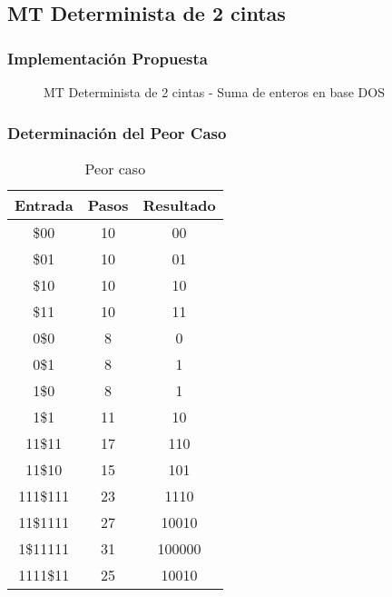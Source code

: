\documentclass{uc3mpracticas}
\begin{document}
  \subsection{MT Determinista de 2 cintas}

  \subsubsection{Implementación Propuesta}

  \begin{figure}[!h]
    \caption{MT Determinista de 2 cintas - Suma de enteros en base DOS}
  \end{figure}


  \subsubsection{Determinación del Peor Caso}

  \begin{table}[!h]
    \centering
  \begin{tabular}{|c|c|c|}
  \hline
  \textbf{Entrada} & \textbf{Pasos} & \textbf{Resultado} \\ \hline
  \$00             & 10             & 00                 \\ \hline
  \$01             & 10             & 01                 \\ \hline
  \$10             & 10             & 10                 \\ \hline
  \$11             & 10             & 11                 \\ \hline
  0\$0             & 8              & 0                  \\ \hline
  0\$1             & 8              & 1                  \\ \hline
  1\$0             & 8              & 1                  \\ \hline
  1\$1             & 11             & 10                 \\ \hline
  11\$11           & 17             & 110                \\ \hline
  11\$10           & 15             & 101                \\ \hline
  111\$111         & 23             & 1110               \\ \hline
  11\$1111         & 27             & 10010              \\ \hline
  1\$11111         & 31             & 100000             \\ \hline
  1111\$11         & 25             & 10010              \\ \hline
  \end{tabular}
  \caption{Peor caso}
  \end{table}
\end{document}
